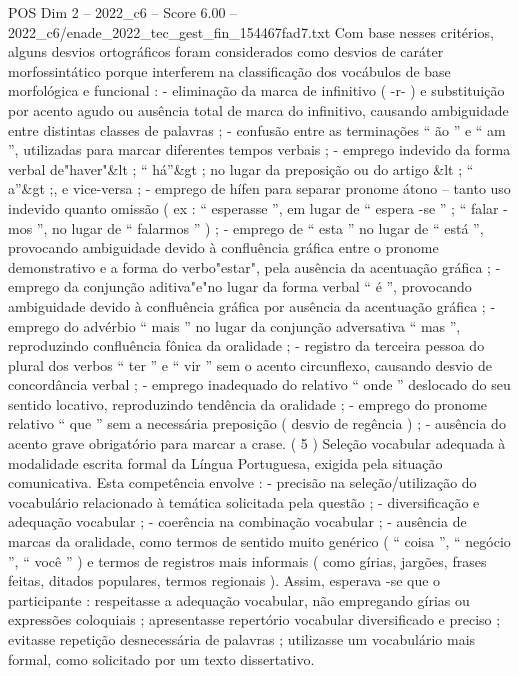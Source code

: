 \begin{textsample}{POS Dim 2 – 2022\_c6 – Score 6.00 – 2022\_c6/enade\_2022\_tec\_gest\_fin\_154467fad7.txt}
Com base nesses critérios, alguns desvios ortográficos foram considerados como desvios de caráter morfossintático porque interferem na classificação dos vocábulos de base morfológica e funcional : - eliminação da marca de infinitivo ( -r- ) e substituição por acento agudo ou ausência total de marca do infinitivo, causando ambiguidade entre distintas classes de palavras ; - confusão entre as terminações “ ão ” e “ am ”, utilizadas para marcar diferentes tempos verbais ; - emprego indevido da forma verbal de"haver"\&lt ; “ há”\&gt ; no lugar da preposição ou do artigo \&lt ; “ a”\&gt ;, e vice-versa ; - emprego de hífen para separar pronome átono – tanto uso indevido quanto omissão ( ex : “ esperasse ”, em lugar de “ espera -se ” ; “ falar -mos ”, no lugar de “ falarmos ” ) ; - emprego de “ esta ” no lugar de “ está ”, provocando ambiguidade devido à confluência gráfica entre o pronome demonstrativo e a forma do verbo"estar", pela ausência da acentuação gráfica ; - emprego da conjunção aditiva"e"no lugar da forma verbal “ é ”, provocando ambiguidade devido à confluência gráfica por ausência da acentuação gráfica ; - emprego do advérbio “ mais ” no lugar da conjunção adversativa “ mas ”, reproduzindo confluência fônica da oralidade ; - registro da terceira pessoa do plural dos verbos “ ter ” e “ vir ” sem o acento circunflexo, causando desvio de concordância verbal ; - emprego inadequado do relativo “ onde ” deslocado do seu sentido locativo, reproduzindo tendência da oralidade ; - emprego do pronome relativo “ que ” sem a necessária preposição ( desvio de regência ) ; - ausência do acento grave obrigatório para marcar a crase. ( 5 ) Seleção vocabular adequada à modalidade escrita formal da Língua Portuguesa, exigida pela situação comunicativa.
Esta competência envolve : - precisão na seleção/utilização do vocabulário relacionado à temática solicitada pela questão ; - diversificação e adequação vocabular ; - coerência na combinação vocabular ; - ausência de marcas da oralidade, como termos de sentido muito genérico ( “ coisa ”, “ negócio ”, “ você ” ) e termos de registros mais informais ( como gírias, jargões, frases feitas, ditados populares, termos regionais ).
Assim, esperava -se que o participante : respeitasse a adequação vocabular, não empregando gírias ou expressões coloquiais ; apresentasse repertório vocabular diversificado e preciso ; evitasse repetição desnecessária de palavras ; utilizasse um vocabulário mais formal, como solicitado por um texto dissertativo.

\end{textsample}
